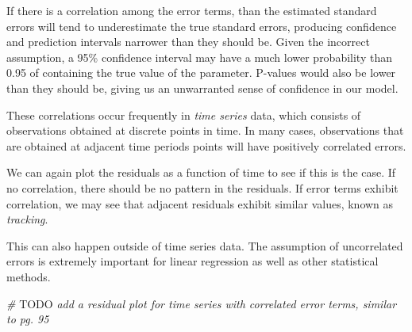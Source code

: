 \documentclass[]{book}
\newenvironment{Shaded}{\begin{snugshade}}{\end{snugshade}}
\newcommand{\AlertTok}[1]{\textcolor[rgb]{0.94,0.16,0.16}{#1}}
\newcommand{\CommentTok}[1]{\textcolor[rgb]{0.56,0.35,0.01}{\textit{#1}}}
\newcommand{\DataTypeTok}[1]{\textcolor[rgb]{0.13,0.29,0.53}{#1}}
\newcommand{\KeywordTok}[1]{\textcolor[rgb]{0.13,0.29,0.53}{\textbf{#1}}}
\newcommand{\NormalTok}[1]{#1}
\newcommand{\OperatorTok}[1]{\textcolor[rgb]{0.81,0.36,0.00}{\textbf{#1}}}
\newcommand{\OtherTok}[1]{\textcolor[rgb]{0.56,0.35,0.01}{#1}}
\newcommand{\StringTok}[1]{\textcolor[rgb]{0.31,0.60,0.02}{#1}}
\begin{document}
If there is a correlation among the error terms, than the estimated standard errors will tend to underestimate the true standard errors, producing confidence and prediction intervals narrower than they should be. Given the incorrect assumption, a 95\% confidence interval may have a much lower probability than 0.95 of containing the true value of the parameter. P-values would also be lower than they should be, giving us an unwarranted sense of confidence in our model.

These correlations occur frequently in \emph{time series} data, which consists of observations obtained at discrete points in time. In many cases, observations that are obtained at adjacent time periods points will have positively correlated errors.

We can again plot the residuals as a function of time to see if this is the case. If no correlation, there should be no pattern in the residuals. If error terms exhibit correlation, we may see that adjacent residuals exhibit similar values, known as \emph{tracking}.

This can also happen outside of time series data. The assumption of uncorrelated errors is extremely important for linear regression as well as other statistical methods.

\begin{Shaded}
\begin{Highlighting}[]
\CommentTok{# }\AlertTok{TODO}\CommentTok{ add a residual plot for time series with correlated error terms, similar to pg. 95}
\end{Highlighting}
\end{Shaded}

\begin{Shaded}
\end{Shaded}
\end{document}
